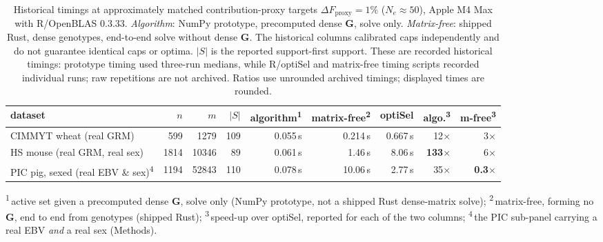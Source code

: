 \documentclass[11pt]{article}
\newcommand{\bG}{\mathbf{G}}
\begin{document}
\begin{table}[ht]
\centering
\caption{Historical timings at approximately matched contribution-proxy targets $\Delta F_{\mathrm{proxy}}=1\%$ ($N_e\approx50$), Apple M4 Max with R/OpenBLAS 0.3.33. \emph{Algorithm}: NumPy prototype, precomputed dense $\bG$, solve only. \emph{Matrix-free}: shipped Rust, dense genotypes, end-to-end solve without dense $\bG$. The historical columns calibrated caps independently and do not guarantee identical caps or optima. $|S|$ is the reported support-first support. These are recorded historical timings: prototype timing used three-run medians, while R/optiSel and matrix-free timing scripts recorded individual runs; raw repetitions are not archived. Ratios use unrounded archived timings; displayed times are rounded.}
\label{tab:optisel}
\small\setlength{\tabcolsep}{3.5pt}
\begin{tabular}{lrrrrrrrr}
\toprule
dataset & $n$ & $m$ & $|S|$ & algorithm\textsuperscript{1} & matrix-free\textsuperscript{2} & optiSel & algo.\textsuperscript{3} & m-free\textsuperscript{3} \\
\midrule
CIMMYT wheat (real GRM)             & 599  & 1279  & 109 & 0.055\,s & 0.214\,s & 0.667\,s & 12$\times$ & 3$\times$ \\
HS mouse (real GRM, real sex)       & 1814 & 10346 & 89  & 0.061\,s & 1.46\,s  & 8.06\,s  & \textbf{133$\times$} & 6$\times$ \\
PIC pig, sexed (real EBV \& sex)\textsuperscript{4} & 1194 & 52843 & 110 & 0.078\,s & 10.06\,s & 2.77\,s & 35$\times$ & \textbf{0.3$\times$} \\
\bottomrule
\end{tabular}
\end{table}

\noindent\textsuperscript{1}\,active set given a precomputed dense $\bG$, solve only (NumPy prototype, not a shipped Rust dense-matrix solve); \textsuperscript{2}\,matrix-free, forming no $\bG$, end to end from genotypes (shipped Rust); \textsuperscript{3}\,speed-up over optiSel, reported for each of the two columns; \textsuperscript{4}\,the PIC sub-panel carrying a real EBV \emph{and} a real sex (Methods).
\end{document}
